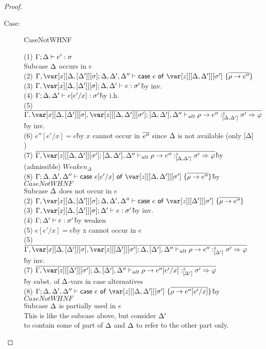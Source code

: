 \begin{proof}
\begin{description}
\item[Case:] CaseNotWHNF
\begin{tabbing}
    (1) $\Gamma;\Delta\vdash e' :\sigma$\\
    Subcase $\Delta$ occurs in $e$\\
    (2) $\G,\xD; \D, \D', \D'' \vdash \ccase{e}{\z[\irr{\D,\D'}][\s']~\{\ov{\rho\to e''}\}}$\\
    (3) $\G,\xD; \D, \D' \vdash e : \s'$\` by inv.\\
    (4) $\Gamma; \Delta,\Delta' \vdash e[e'/x] : \sigma'$\` by i.h.\\
    (5) $\ov{\G,\xD,\z[\irr{\D,\D'}][\s']; [\D,\D'],\D'' \vdash_{alt} \rho \to e'' :^z_{\irr{\D,\D'}} \s'\Rightarrow\vp}$\` by inv.\\
    (6) $e''[e'/x] = e$\` by $x$ cannot occur in $\overline{e''}$ since $\Delta$ is not available (only $\left[\Delta\right]$)\\
    (7) $\ov{\G,\z[\irr{\D,\D'}][\s']; [\D,\D'],\D'' \vdash_{alt} \rho \to e'' :^z_{\irr{\D,\D'}} \s'\Rightarrow\vp}$\` by (admissible) $Weaken_\Delta$\\
    (8) $\G; \D, \D', \D'' \vdash \ccase{e[e'/x]}{\z[\irr{\D,\D'}][\s']~\{\ov{\rho\to e''}\}}$\`by $CaseNotWHNF$\\
    Subcase $\Delta$ does not occur in $e$\\
    (2) $\G,\xD; \D, \D', \D'' \vdash \ccase{e}{\z[\irr{\D'}][\s']~\{\ov{\rho\to e''}\}}$\\
    (3) $\G,\xD; \D' \vdash e : \s'$\` by inv.\\
    (4) $\Gamma; \Delta' \vdash e : \sigma'$\` by weaken\\
    (5) $e[e'/x] = e$\` by x cannot occur in $e$\\
    (5) $\ov{\G,\xD,\z[\irr{\D'}][\s']; \D,[\D'],\D'' \vdash_{alt} \rho \to e'' :^z_{\irr{\D'}} \s'\Rightarrow\vp}$\` by inv.\\
    (7) $\ov{\G,\z[\irr{\D'}][\s']; \D,[\D'],\D'' \vdash_{alt} \rho \to e''[e'/x] :^z_{\irr{\D'}} \s'\Rightarrow\vp}$\\\` by subst. of $\Delta$-vars in case alternatives\\
    (8) $\G; \D, \D', \D'' \vdash \ccase{e}{\z[\irr{\D,\D'}][\s']~\{\ov{\rho\to e''[e'/x]}\}}$\`by $CaseNotWHNF$\\
    Subcase $\Delta$ is partially used in $e$\\
    This is like the subcase above, but consider $\Delta'$\\
    to contain some of part of $\Delta$ and $\Delta$ to refer to the other part only.
\end{tabbing}

\end{description}

\end{proof}


